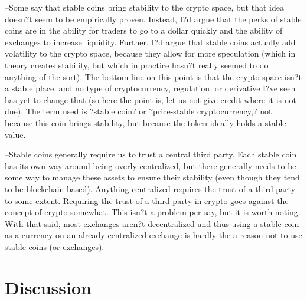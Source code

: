 --Some say that stable coins bring stability to the crypto space, but that idea doesn?t seem to be empirically proven. Instead, I?d argue that the perks of stable coins are in the ability for traders to go to a dollar quickly and the ability of exchanges to increase liquidity. Further, I?d argue that stable coins actually add volatility to the crypto space, because they allow for more speculation (which in theory creates stability, but which in practice hasn?t really seemed to do anything of the sort). The bottom line on this point is that the crypto space isn?t a stable place, and no type of cryptocurrency, regulation, or derivative I?ve seen has yet to change that (so here the point is, let us not give credit where it is not due). The term used is ?stable coin? or ?price-stable cryptocurrency,? not because this coin brings stability, but because the token ideally holds a stable value.

--Stable coins generally require us to trust a central third party. Each stable coin has its own way around being overly centralized, but there generally needs to be some way to manage these assets to ensure their stability (even though they tend to be blockchain based). Anything centralized requires the trust of a third party to some extent. Requiring the trust of a third party in crypto goes against the concept of crypto somewhat. This isn?t a problem per-say, but it is worth noting. With that said, most exchanges aren?t decentralized and thus using a stable coin as a currency on an already centralized exchange is hardly the a reason not to use stable coins (or exchanges).



\section{Discussion}


